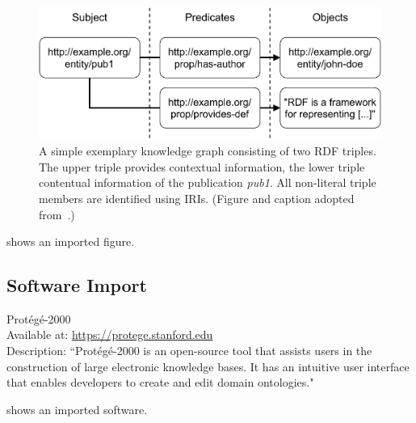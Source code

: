  \begin{figure}[htb!]
 \centering
 \includegraphics[max width=0.7\columnwidth]{./figures/triple_example}
 \caption{A simple exemplary knowledge graph consisting of two RDF triples. The upper triple provides contextual information, the lower triple contentual information of the publication \emph{{pub1}}. All non-literal triple members are identified using IRIs. (Figure and caption adopted from~\cite{Martin21}.)}
 \label{fig:contentual-contextual}
 \end{figure}
 
 shows an imported figure.

\subsection{Software Import}


 \begin{software}
 Prot{\'{e}}g{\'{e}}-2000~\cite{DBLP:conf/amia/NoyCFKTVM03}\\
 Available at: \url{https://protege.stanford.edu}\\
 Description: ``Prot\'{e}g\'{e}-2000 is an open-source tool that assists users in the construction of large electronic knowledge bases. It has an intuitive user interface that enables developers to create and edit domain ontologies."~\cite{DBLP:conf/amia/NoyCFKTVM03}
 \label{software:protege}
 \end{software}
 
 shows an imported software.


